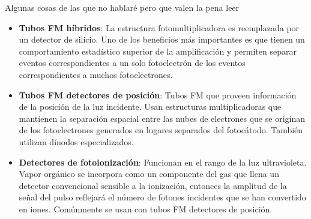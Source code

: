\documentclass[a4paper,10pt]{beamer}
\begin{document}
\begin{frame}{Algunas cosas de las que no hablaré pero que valen la pena leer}
 \begin{itemize}
 \item \begin{justify}
        \textbf{Tubos FM híbridos}: La estructura fotomultiplicadora es reemplazada 
        por un detector de silicio. Uno de los beneficios más importantes es que 
        tienen un comportamiento estadístico superior de la amplificación  y 
        permiten separar eventos correspondientes a un solo fotoelectrón de 
        los eventos correspondientes a muchos fotoelectrones.
       \end{justify}
 \item \begin{justify}
        \textbf{Tubos FM detectores de posición}: Tubos FM que proveen información 
        de la posición de la luz incidente. Usan estructuras multiplicadoras que mantienen 
        la separación espacial entre las nubes de electrones que se originan de 
        los fotoelectrones generados en lugares separados del fotocátodo. También utilizan 
        dínodos especializados.
       \end{justify}
  \item \begin{justify}
        \textbf{Detectores de fotoionización}: Funcionan en el rango de la luz 
        ultravioleta. Vapor orgánico se incorpora como un componente del gas que 
        llena un detector convencional sensible a la ionización, entonces la amplitud 
        de la señal del pulso reflejará el número de fotones incidentes que se han 
        convertido en iones. Comúnmente se usan con tubos FM detectores de posición.
       \end{justify}
\end{itemize}
\end{frame}
\end{document}
